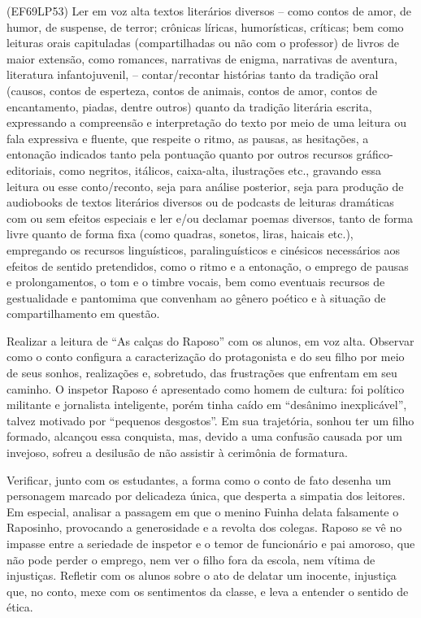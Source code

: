 (EF69LP53) Ler em voz alta textos literários diversos – como contos de amor, de humor, de suspense, de terror; crônicas líricas, humorísticas, críticas; bem como leituras orais capituladas (compartilhadas ou não com o professor) de livros de maior extensão, como romances, narrativas de enigma, narrativas de aventura, literatura infantojuvenil, – contar/recontar histórias tanto da tradição oral (causos, contos de esperteza, contos de animais, contos de amor, contos de encantamento, piadas, dentre outros) quanto da tradição literária escrita, expressando a compreensão e interpretação do texto por meio de uma leitura ou fala expressiva e fluente, que respeite o ritmo, as pausas, as hesitações, a entonação indicados tanto pela pontuação quanto por outros recursos gráfico-editoriais, como negritos, itálicos, caixa-alta, ilustrações etc., gravando essa leitura ou esse conto/reconto, seja para análise posterior, seja para produção de audiobooks de textos literários diversos ou de podcasts de leituras dramáticas com ou sem efeitos especiais e ler e/ou declamar poemas diversos, tanto de forma livre quanto de forma fixa (como quadras, sonetos, liras, haicais etc.), empregando os recursos linguísticos, paralinguísticos e cinésicos necessários aos efeitos de sentido pretendidos, como o ritmo e a entonação, o emprego de pausas e prolongamentos, o tom e o timbre vocais, bem como eventuais recursos de gestualidade e pantomima que convenham ao gênero poético e à situação de compartilhamento em questão.

Realizar a leitura de ``As calças do Raposo'' com os alunos, em voz
alta. Observar como o conto configura a caracterização do protagonista e
do seu filho por meio de seus sonhos, realizações e, sobretudo, das
frustrações que enfrentam em seu caminho. O inspetor Raposo é
apresentado como homem de cultura: foi político militante e jornalista
inteligente, porém tinha caído em ``desânimo inexplicável'', talvez
motivado por ``pequenos desgostos''. Em sua trajetória, sonhou ter um
filho formado, alcançou essa conquista, mas, devido a uma confusão
causada por um invejoso, sofreu a desilusão de não assistir à cerimônia
de formatura.

Verificar, junto com os estudantes, a forma como o conto de fato desenha
um personagem marcado por delicadeza única, que desperta a simpatia dos
leitores. Em especial, analisar a passagem em que o menino Fuinha delata
falsamente o Raposinho, provocando a generosidade e a revolta dos
colegas. Raposo se vê no impasse entre a seriedade de inspetor e o temor
de funcionário e pai amoroso, que não pode perder o emprego, nem ver o
filho fora da escola, nem vítima de injustiças. Refletir com os alunos
sobre o ato de delatar um inocente, injustiça que, no conto, mexe com os
sentimentos da classe, e leva a entender o sentido de ética.

